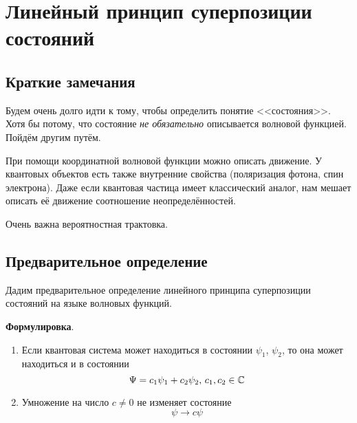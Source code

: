 \section{Линейный принцип суперпозиции состояний}
\subsection{Краткие замечания}
Будем очень долго идти к тому, чтобы определить понятие <<состояния>>. Хотя бы потому, что состояние \emph{не обязательно} описывается волновой функцией. Пойдём другим путём.

При помощи координатной волновой функции  можно описать движение. У квантовых объектов есть также внутренние свойства (поляризация фотона, спин электрона). Даже если квантовая частица имеет классический аналог, нам мешает описать её движение соотношение неопределённостей.

Очень важна вероятностная трактовка.

\subsection{Предварительное определение}
Дадим предварительное определение линейного принципа суперпозиции состояний на языке волновых функций.

\textbf{Формулировка}.
\begin{enumerate}
  \item Если квантовая система может находиться в состоянии  $\psi_1$, $\psi_2$, то она может находиться и в состоянии
$$
    \Psi = c_1 \psi_1 + c_2 \psi_2, \, c_1, c_2 \in \mathbb {C}
$$
  \item Умножение на число $c \ne 0$ не изменяет состояние
$$
    \psi \to c\psi
$$
\end{enumerate}


